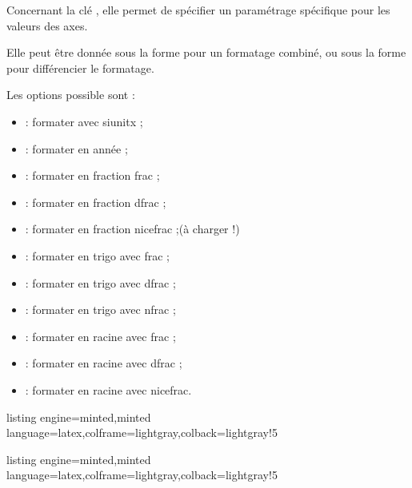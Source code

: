 \documentclass[11pt,a4paper]{ltxdoc}
\begin{document}
\smallskip

Concernant la clé , elle permet de spécifier un paramétrage spécifique pour les valeurs des axes.

\smallskip

Elle peut être donnée sous la forme  pour un formatage combiné, ou sous la forme  pour différencier le formatage.

\smallskip

Les options possible sont :

\smallskip

\begin{itemize}
	\item {} : formater avec \textsf{siunitx} ;
	\item {} : formater en année ;
	\item {} : formater en fraction \textsf{frac} ;
	\item {} : formater en fraction \textsf{dfrac} ;
	\item {} : formater en fraction \textsf{nicefrac} ;\hfill(à charger !)
	\item {} : formater en trigo avec \textsf{frac} ;
	\item {} : formater en trigo avec \textsf{dfrac} ;
	\item {} : formater en trigo avec \textsf{nfrac} ;
	\item {} : formater en racine avec \textsf{frac} ;
	\item {} : formater en racine avec \textsf{dfrac} ;
	\item {} : formater en racine avec \textsf{nicefrac}.
\end{itemize}

\smallskip

\begin{tcblisting}{listing engine=minted,minted language=latex,colframe=lightgray,colback=lightgray!5}
\begin{GraphiqueTikz}
	[x=0.075cm,y=0.03cm,Xmin=0,Xmax=160,Xgrille=20,Xgrilles=10,
	Origy=250,Ymin=250,Ymax=400,Ygrille=25,Ygrilles=5]
\end{GraphiqueTikz}
\end{tcblisting}

\begin{tcblisting}{listing engine=minted,minted language=latex,colframe=lightgray,colback=lightgray!5}
\begin{GraphiqueTikz}%
	[x=0.9cm,y=0.425cm,Xmin=4,Xmax=20,Origx=4,
	Ymin=40,Ymax=56,Ygrille=2,Ygrilles=1,Origy=40]
\end{GraphiqueTikz}
\end{tcblisting}
\end{document}
